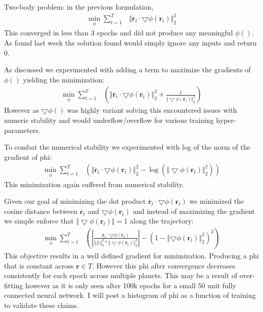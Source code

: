 \documentclass[10pt,letterpaper]{report}
\author{Brandon Houghton}
\begin{document}
Two-body problem: in the previous formulation,
\begin{align}
\min_{\phi} \sum^{T}_{t = 1} & \Vert \dot{\pmb{r}_t} \cdot \bigtriangledown \phi \left( \pmb{r}_t \right) \Vert^2_2
\end{align}
This converged in less than 3 epochs and did not produce any meaningful $\phi()$. As found last week the solution found would simply ignore any inputs and return $0$.


As discussed we experimented with adding a term to maximize the gradients of $\phi()$ yielding the minimization: 
\begin{align}
\min_{\phi} \sum^{T}_{t = 1} & \left( \Vert \dot{\pmb{r}_t} \cdot \bigtriangledown \phi \left( \pmb{r}_t \right) \Vert^2_2 + \frac{1}{\Vert \bigtriangledown \phi \left( \pmb{r}_t \right) \Vert^2_2} \right)
\end{align}
However as $\bigtriangledown\phi()$ was highly variant solving this encountered issues with numeric stability and would underflow/overflow for various training hyper-parameters.


To combat the numerical stability we experimented with log of the norm of the gradient of phi:
\begin{align}
\min_{\phi} \sum^{T}_{t = 1} & \left( \Vert \dot{\pmb{r}_t} \cdot \bigtriangledown \phi \left( \pmb{r}_t \right) \Vert^2_2 -
\log{ \left( \Vert \bigtriangledown \phi \left( \pmb{r}_t \right) \Vert^2_2 \right)} \right)
\end{align}
This minimization again suffered from numerical stability.


Given our goal of minimizing the dot product $\dot{\pmb{r}_t} \cdot \bigtriangledown \phi \left( \pmb{r}_t \right)$ we minimized the cosine distance between $\dot{\pmb{r}_t}$ and $ \bigtriangledown \phi \left( \pmb{r}_t \right)$ and instead of maximizing the gradient we simple enforce that $\Vert \bigtriangledown\phi({\pmb r}_t) \Vert = 1$ along the trajectory:
\begin{align}
\min_{\phi} \sum^{T}_{t = 1} &  
\left( \left\vert
	\frac{\dot{\pmb{r}_t} \cdot \bigtriangledown \phi \left( \pmb{r}_t \right)}{{\Vert f_t \Vert}^2_2 * {\Vert \bigtriangledown \phi (\pmb{r}_t) \Vert}^2_2}
 \right \vert
 - \left( 1-\left\Vert \bigtriangledown \phi \left( \pmb{r}_t \right) \right\Vert^2_2 \right)^2 \right)
\end{align}
This objective results in a well defined gradient for minimization. Producing a phi that is constant across $ {\pmb r} \in T$. However this phi after convergence decreases consistently for each epoch across multiple planets. This may be a result of over-fitting however as it is only seen after 100k epochs for a small 50 unit fully connected neural network. I will post a histogram of phi as a function of training to validate these claims.
\end{document}
